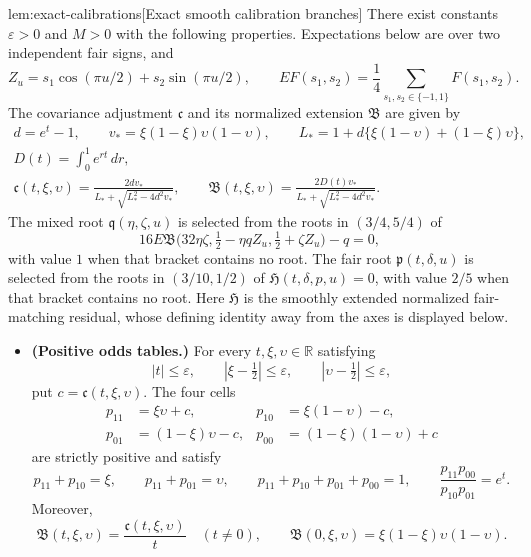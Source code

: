 \begin{lemmav}{lem:exact-calibrations}[Exact smooth calibration branches]
There exist constants \(\varepsilon>0\) and \(M>0\) with the following properties. Expectations below are over two independent fair signs, and
\[
Z_u=s_1\cos(\pi u/2)+s_2\sin(\pi u/2),
\qquad
E F(s_1,s_2)=\frac14\sum_{s_1,s_2\in\{-1,1\}}F(s_1,s_2).
\]
The covariance adjustment \(\mathfrak c\) and its normalized extension \(\mathfrak B\) are given by
\[
\begin{gathered}
d=e^t-1,\qquad
v_*=\xi(1-\xi)\upsilon(1-\upsilon),\qquad
L_*=1+d\{\xi(1-\upsilon)+(1-\xi)\upsilon\},\\
D(t)=\int_0^1 e^{rt}\,dr,\\
\mathfrak c(t,\xi,\upsilon)
=\frac{2d v_*}{L_*+\sqrt{L_*^2-4d^2v_*}},
\qquad
\mathfrak B(t,\xi,\upsilon)
=\frac{2D(t)v_*}{L_*+\sqrt{L_*^2-4d^2v_*}}.
\end{gathered}
\]
The mixed root \(\mathfrak q(\eta,\zeta,u)\) is selected from the roots in \((3/4,5/4)\) of
\[
16E\mathfrak B
 \bigl(32\eta\zeta,\tfrac12-\eta qZ_u,\tfrac12+\zeta Z_u\bigr)-q=0,
\]
with value \(1\) when that bracket contains no root. The fair root
\(\mathfrak p(t,\delta,u)\) is selected from the roots in \((3/10,1/2)\) of
\(\mathfrak H(t,\delta,p,u)=0\), with value \(2/5\) when that bracket contains no root. Here \(\mathfrak H\) is the smoothly extended normalized fair-matching residual, whose defining identity away from the axes is displayed below.

\begin{itemize}
\item \textbf{(Positive odds tables.)}
For every \(t,\xi,\upsilon\in\mathbb R\) satisfying
\[
|t|\le\varepsilon,\qquad
|\xi-\tfrac12|\le\varepsilon,\qquad
|\upsilon-\tfrac12|\le\varepsilon,
\]
put \(c=\mathfrak c(t,\xi,\upsilon)\). The four cells
\[
\begin{aligned}
p_{11}&=\xi\upsilon+c,&
p_{10}&=\xi(1-\upsilon)-c,\\
p_{01}&=(1-\xi)\upsilon-c,&
p_{00}&=(1-\xi)(1-\upsilon)+c
\end{aligned}
\]
are strictly positive and satisfy
\[
p_{11}+p_{10}=\xi,\qquad
p_{11}+p_{01}=\upsilon,\qquad
p_{11}+p_{10}+p_{01}+p_{00}=1,\qquad
\frac{p_{11}p_{00}}{p_{10}p_{01}}=e^t.
\]
Moreover,
\[
\mathfrak B(t,\xi,\upsilon)=\frac{\mathfrak c(t,\xi,\upsilon)}{t}
\quad(t\ne0),\qquad
\mathfrak B(0,\xi,\upsilon)=\xi(1-\xi)\upsilon(1-\upsilon).
\]


\end{itemize}
\end{lemmav}
